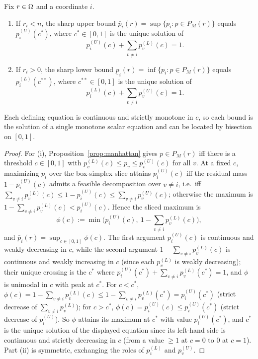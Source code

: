 \begin{lemma}\label{lem:manhattan-unimodal}
Fix \(r\in\Omega\) and a coordinate \(i\).
\begin{enumerate}
\item[(i)] If \(r_i<n\), the sharp upper bound \(\bar p_i(r)=\sup\{p_i:p\in P_M(r)\}\) equals \(p_i^{(U)}(c^*)\), where \(c^*\in[0,1]\) is the unique solution of
\[
p_i^{(U)}(c)+\sum_{v\ne i}p_v^{(L)}(c)=1.
\]
\item[(ii)] If \(r_i>0\), the sharp lower bound \(\underline p_i(r)=\inf\{p_i:p\in P_M(r)\}\) equals \(p_i^{(L)}(c^{**})\), where \(c^{**}\in[0,1]\) is the unique solution of
\[
p_i^{(L)}(c)+\sum_{v\ne i}p_v^{(U)}(c)=1.
\]
\end{enumerate}
Each defining equation is continuous and strictly monotone in \(c\), so each bound is the solution of a single monotone scalar equation and can be located by bisection on \([0,1]\).
\end{lemma}

\begin{proof}
For (i), Proposition~\ref{prop:manhattan} gives \(p\in P_M(r)\) iff there is a threshold \(c\in[0,1]\) with \(p_v^{(L)}(c)\le p_v\le p_v^{(U)}(c)\) for all \(v\). At a fixed \(c\), maximizing \(p_i\) over the box-simplex slice attains \(p_i^{(U)}(c)\) iff the residual mass \(1-p_i^{(U)}(c)\) admits a feasible decomposition over \(v\ne i\), i.e.\ iff
\(\sum_{v\ne i}p_v^{(L)}(c)\le 1-p_i^{(U)}(c)\le\sum_{v\ne i}p_v^{(U)}(c)\); otherwise the maximum is \(1-\sum_{v\ne i}p_v^{(L)}(c)<p_i^{(U)}(c)\). Hence the sliced maximum is
\[
\phi(c):=\min\!\big(p_i^{(U)}(c),\ 1-\textstyle\sum_{v\ne i}p_v^{(L)}(c)\big),
\]
and \(\bar p_i(r)=\sup_{c\in[0,1]}\phi(c)\). The first argument \(p_i^{(U)}(c)\) is continuous and weakly decreasing in \(c\), while the second argument \(1-\sum_{v\ne i}p_v^{(L)}(c)\) is continuous and weakly increasing in \(c\) (since each \(p_v^{(L)}\) is weakly decreasing); their unique crossing is the \(c^*\) where \(p_i^{(U)}(c^*)+\sum_{v\ne i}p_v^{(L)}(c^*)=1\), and \(\phi\) is unimodal in \(c\) with peak at \(c^*\). For \(c<c^*\), \(\phi(c)=1-\sum_{v\ne i}p_v^{(L)}(c)\le 1-\sum_{v\ne i}p_v^{(L)}(c^*)=p_i^{(U)}(c^*)\) (strict decrease of \(\sum_{v\ne i}p_v^{(L)}\)); for \(c>c^*\), \(\phi(c)=p_i^{(U)}(c)\le p_i^{(U)}(c^*)\) (strict decrease of \(p_i^{(U)}\)). So \(\phi\) attains its maximum at \(c^*\) with value \(p_i^{(U)}(c^*)\), and \(c^*\) is the unique solution of the displayed equation since its left-hand side is continuous and strictly decreasing in \(c\) (from a value \(\ge 1\) at \(c=0\) to \(0\) at \(c=1\)). Part (ii) is symmetric, exchanging the roles of \(p_v^{(L)}\) and \(p_v^{(U)}\).
\end{proof}

